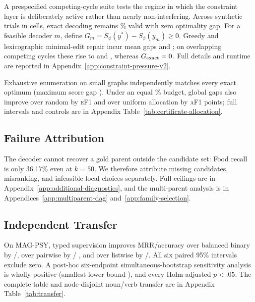 \documentclass[11pt]{article}
\newcommand{\ef}{\textsc{eF1}}
\newcommand{\af}{\textsc{aF1}}
\begin{document}
A prespecified competing-cycle suite tests the regime in which the
constraint layer is deliberately active rather than nearly non-interfering.
Across \PressureRuns{} synthetic trials in \PressureCells{} cells, exact decoding
remains \PressureExactValid\% valid with zero optimality gap. For a feasible
decoder $m$, define $G_m=S_\phi(y^*)-S_\phi(y_m)\geq0$. Greedy and
lexicographic minimal-edit repair incur mean gaps
\PressureGreedyRegret{} and \PressureMinimalRegret{}; on overlapping competing
cycles these rise to \PressureOverlapGreedyRegret{} and
\PressureOverlapMinimalRegret{}, whereas $G_{\rm exact}=0$. Full details
and runtime are reported in Appendix~\ref{app:constraint-pressure-v2}.

Exhaustive enumeration on \RobustSolverTrials{} small graphs independently
matches every exact optimum (maximum score gap \RobustSolverMaxGap{}). Under an
equal \CertPairFraction\% budget, global gaps also improve over random by
\CertOnlyMinusRandomEdge{} \ef{} and over uniform allocation by
\CertOnlyMinusUniformAncestor{} \af{} points; full intervals and controls are
in Appendix Table~\ref{tab:certificate-allocation}.

\subsection{Failure Attribution}

The decoder cannot recover a gold parent outside the candidate set: Food recall
is only 36.17\% even at $k=50$. We therefore attribute missing candidates,
misranking, and infeasible local choices separately. Full ceilings are in
Appendix~\ref{app:additional-diagnostics}, and the multi-parent analysis is in
Appendices~\ref{app:multiparent-dag} and~\ref{app:family-selection}.

\subsection{Independent Transfer}

On MAG-PSY, typed supervision improves MRR/accuracy over balanced binary by
\MatchedObjectiveMAGPSYTypedMinusBinaryMRR{}/\MatchedObjectiveMAGPSYTypedMinusBinaryAcc{}, over
pairwise by \MatchedObjectiveMAGPSYTypedMinusPairwiseMRR{}/
\MatchedObjectiveMAGPSYTypedMinusPairwiseAcc{}, and over listwise by
\MatchedObjectiveMAGPSYTypedMinusListwiseMRR{}/\MatchedObjectiveMAGPSYTypedMinusListwiseAcc{}.
All six paired 95\% intervals exclude zero. A post-hoc six-endpoint
simultaneous-bootstrap sensitivity analysis is wholly positive (smallest lower
bound \MatchedObjectiveMAGPSYMinLower{}), and every Holm-adjusted $p<.05$. The complete
table and node-disjoint noun/verb transfer are in
Appendix Table~\ref{tab:transfer}.
\end{document}
